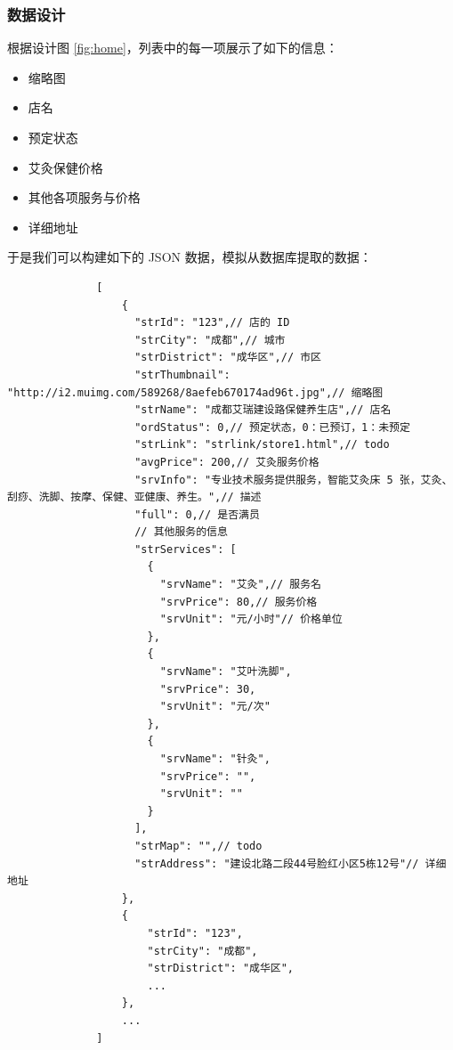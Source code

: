 \documentclass[UTF8]{ctexbook}
\begin{document}
        \subsubsection{数据设计}
          \label{subsubsec:数据设计}
            根据设计图 \ref{fig:home}，列表中的每一项展示了如下的信息：
            \begin{itemize}
              \item 缩略图
              \item 店名
              \item 预定状态
              \item 艾灸保健价格
              \item 其他各项服务与价格
              \item 详细地址
            \end{itemize}
            于是我们可以构建如下的 JSON 数据，模拟从数据库提取的数据：
            \begin{lstlisting}
              [
                  {
                    "strId": "123",// 店的 ID
                    "strCity": "成都",// 城市
                    "strDistrict": "成华区",// 市区
                    "strThumbnail": "http://i2.muimg.com/589268/8aefeb670174ad96t.jpg",// 缩略图
                    "strName": "成都艾瑞建设路保健养生店",// 店名
                    "ordStatus": 0,// 预定状态，0：已预订，1：未预定
                    "strLink": "strlink/store1.html",// todo
                    "avgPrice": 200,// 艾灸服务价格
                    "srvInfo": "专业技术服务提供服务，智能艾灸床 5 张，艾灸、刮痧、洗脚、按摩、保健、亚健康、养生。",// 描述
                    "full": 0,// 是否满员
                    // 其他服务的信息
                    "strServices": [
                      {
                        "srvName": "艾灸",// 服务名
                        "srvPrice": 80,// 服务价格
                        "srvUnit": "元/小时"// 价格单位
                      },
                      {
                        "srvName": "艾叶洗脚",
                        "srvPrice": 30,
                        "srvUnit": "元/次"
                      },
                      {
                        "srvName": "针灸",
                        "srvPrice": "",
                        "srvUnit": ""
                      }
                    ],
                    "strMap": "",// todo
                    "strAddress": "建设北路二段44号脸红小区5栋12号"// 详细地址
                  },
                  {
                      "strId": "123",
                      "strCity": "成都",
                      "strDistrict": "成华区",
                      ...
                  },
                  ...
              ]
            \end{lstlisting}
\end{document}
